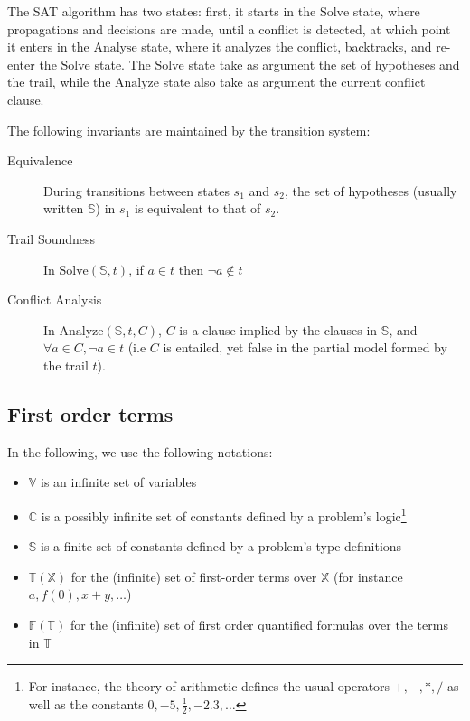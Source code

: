 \documentclass{article}
\begin{document}
The SAT algorithm has two states: first, it starts in the $\text{Solve}$ state, where propagations
and decisions are made, until a conflict is detected, at which point it enters in the $\text{Analyse}$
state, where it analyzes the conflict, backtracks, and re-enter the $\text{Solve}$ state.
The $\text{Solve}$ state take as argument the set of hypotheses and the trail, while
the $\text{Analyze}$ state also take as argument the current conflict clause.

The following invariants are maintained by the transition system:
\begin{description}
  \item[Equivalence] During transitions between states $s_1$ and $s_2$, the set of hypotheses
    (usually written $\mathbb{S}$) in $s_1$ is equivalent to that of $s_2$.
  \item[Trail Soundness] In $\text{Solve}(\mathbb{S}, t)$, if $a \in t$ then $\neg a \notin t$
  \item[Conflict Analysis] In $\text{Analyze}(\mathbb{S}, t, C)$, $C$ is a clause implied by the
    clauses in $\mathbb{S}$, and $\forall a \in C, \neg a \in t$ (i.e $C$ is entailed, yet false
    in the partial model formed by the trail $t$).
\end{description}

\subsection{First order terms}

In the following, we use the following notations:
\begin{itemize}
  \item $\mathbb{V}$ is an infinite set of variables
  \item $\mathbb{C}$ is a possibly infinite set of constants defined
    by a problem's logic\footnote{For instance, the theory of arithmetic
    defines the usual operators $+, -, *, /$ as well as the constants
    $0, -5, \frac{1}{2}, -2.3, \ldots$}
  \item $\mathbb{S}$ is a finite set of constants defined by a problem's type definitions
  \item $\mathbb{T}(\mathbb{X})$ for the (infinite) set of first-order terms over $\mathbb{X}$
    (for instance $a, f(0), x + y, \ldots$)
  \item $\mathbb{F}(\mathbb{T})$ for the (infinite) set of first order quantified formulas
    over the terms in $\mathbb{T}$
\end{itemize}
\end{document}
